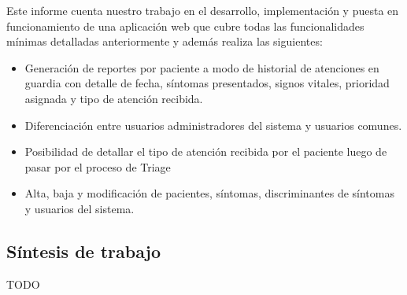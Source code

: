 Este informe cuenta nuestro trabajo en el desarrollo, implementación y puesta en funcionamiento de una aplicación web que cubre todas las funcionalidades mínimas detalladas anteriormente y además realiza las siguientes:
\begin{itemize}
\item Generación de reportes por paciente a modo de historial de atenciones en guardia con detalle de fecha, síntomas presentados, signos vitales, prioridad asignada y tipo de atención recibida.
\item Diferenciación entre usuarios administradores del sistema y usuarios comunes.
\item Posibilidad de detallar el tipo de atención recibida por el paciente luego de pasar por el proceso de Triage
\item Alta, baja y modificación de pacientes, síntomas, discriminantes de síntomas y usuarios del sistema.
\end{itemize}
\subsection{Síntesis de trabajo}
TODO